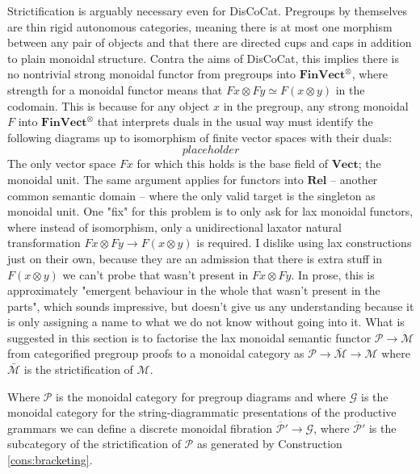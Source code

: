 Strictification is arguably necessary even for DisCoCat. Pregroups by themselves are thin rigid autonomous categories, meaning there is at most one morphism between any pair of objects and that there are directed cups and caps in addition to plain monoidal structure. Contra the aims of DisCoCat, this implies there is no nontrivial strong monoidal functor from pregroups into $\textbf{FinVect}^\otimes$, where strength for a monoidal functor means that $Fx \otimes Fy \simeq F(x \otimes y)$ in the codomain. This is because for any object $x$ in the pregroup, any strong monoidal $F$ into $\textbf{FinVect}^\otimes$ that interprets duals in the usual way must identify the following diagrams up to isomorphism of finite vector spaces with their duals:
\[placeholder\]
The only vector space $Fx$ for which this holds is the base field of $\textbf{Vect}$; the monoidal unit. The same argument applies for functors into $\textbf{Rel}$ -- another common semantic domain -- where the only valid target is the singleton as monoidal unit. One "fix" for this problem is to only ask for lax monoidal functors, where instead of isomorphism, only a unidirectional laxator natural transformation $Fx \otimes Fy \rightarrow F(x \otimes y)$ is required. I dislike using lax constructions just on their own, because they are an admission that there is extra stuff in $F(x \otimes y)$ we can't probe that wasn't present in $Fx \otimes Fy$. In prose, this is approximately "emergent behaviour in the whole that wasn't present in the parts", which sounds impressive, but doesn't give us any understanding because it is only assigning a name to what we do not know without going into it. What is suggested in this section is to factorise the lax monoidal semantic functor $\mathcal{P} \rightarrow \mathcal{M}$ from categorified pregroup proofs to a monoidal category as $\mathcal{P} \rightarrow \bar{\mathcal{M}} \rightarrow \mathcal{M}$ where $\bar{\mathcal{M}}$ is the strictification of $\mathcal{M}$. %




\begin{construction}
Where $\mathcal{P}$ is the monoidal category for pregroup diagrams and where $\mathcal{G}$ is the monoidal category for the string-diagrammatic presentations of the productive grammars we can define a discrete monoidal fibration $\overline{\mathcal{P}}' \rightarrow \mathcal{G}$, where $\overline{\mathcal{P}}'$ is the subcategory of the strictification of $\mathcal{P}$ as generated by Construction \ref{cons:bracketing}.
\end{construction}



